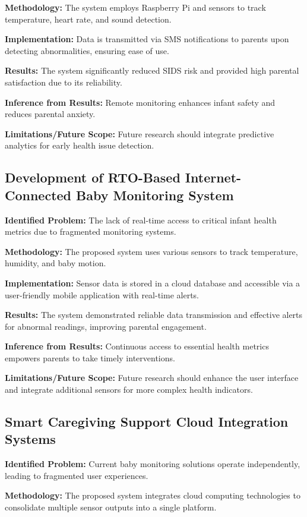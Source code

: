 \documentclass[conference]{IEEEtran}
\begin{document}
\textbf{Methodology:} The system employs Raspberry Pi and sensors to track temperature, heart rate, and sound detection.

\textbf{Implementation:} Data is transmitted via SMS notifications to parents upon detecting abnormalities, ensuring ease of use.

\textbf{Results:} The system significantly reduced SIDS risk and provided high parental satisfaction due to its reliability.

\textbf{Inference from Results:} Remote monitoring enhances infant safety and reduces parental anxiety.

\textbf{Limitations/Future Scope:} Future research should integrate predictive analytics for early health issue detection.

\subsection{Development of RTO-Based Internet-Connected Baby Monitoring System}
\textbf{Identified Problem:} The lack of real-time access to critical infant health metrics due to fragmented monitoring systems.

\textbf{Methodology:} The proposed system uses various sensors to track temperature, humidity, and baby motion.

\textbf{Implementation:} Sensor data is stored in a cloud database and accessible via a user-friendly mobile application with real-time alerts.

\textbf{Results:} The system demonstrated reliable data transmission and effective alerts for abnormal readings, improving parental engagement.

\textbf{Inference from Results:} Continuous access to essential health metrics empowers parents to take timely interventions.

\textbf{Limitations/Future Scope:} Future research should enhance the user interface and integrate additional sensors for more complex health indicators.

\subsection{Smart Caregiving Support Cloud Integration Systems}
\textbf{Identified Problem:} Current baby monitoring solutions operate independently, leading to fragmented user experiences.

\textbf{Methodology:} The proposed system integrates cloud computing technologies to consolidate multiple sensor outputs into a single platform.
\end{document}
